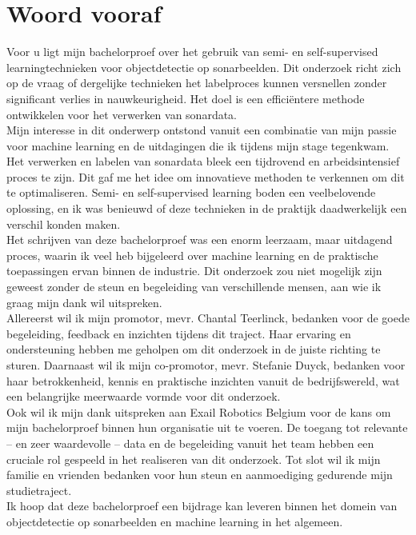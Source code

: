 
\chapter*{Woord vooraf}%
\label{ch:voorwoord}

Voor u ligt mijn bachelorproef over het gebruik van semi- en self-supervised learningtechnieken voor objectdetectie op sonarbeelden. Dit onderzoek richt zich op de vraag of dergelijke technieken het labelproces kunnen versnellen zonder significant verlies in nauwkeurigheid. Het doel is een efficiëntere methode ontwikkelen voor het verwerken van sonardata. \\

Mijn interesse in dit onderwerp ontstond vanuit een combinatie van mijn passie voor machine learning en de uitdagingen die ik tijdens mijn stage tegenkwam. Het verwerken en labelen van sonardata bleek een tijdrovend en arbeidsintensief proces te zijn. Dit gaf me het idee om innovatieve methoden te verkennen om dit te optimaliseren. Semi- en self-supervised learning boden een veelbelovende oplossing, en ik was benieuwd of deze technieken in de praktijk daadwerkelijk een verschil konden maken. \\

Het schrijven van deze bachelorproef was een enorm leerzaam, maar uitdagend proces, waarin ik veel heb bijgeleerd over machine learning en de praktische toepassingen ervan binnen de industrie. Dit onderzoek zou niet mogelijk zijn geweest zonder de steun en begeleiding van verschillende mensen, aan wie ik graag mijn dank wil uitspreken. \\

Allereerst wil ik mijn promotor, mevr. Chantal Teerlinck, bedanken voor de goede begeleiding, feedback en inzichten tijdens dit traject. Haar ervaring en ondersteuning hebben me geholpen om dit onderzoek in de juiste richting te sturen. Daarnaast wil ik mijn co-promotor, mevr. Stefanie Duyck, bedanken voor haar betrokkenheid, kennis en praktische inzichten vanuit de bedrijfswereld, wat een belangrijke meerwaarde vormde voor dit onderzoek. \\

Ook wil ik mijn dank uitspreken aan Exail Robotics Belgium voor de kans om mijn bachelorproef binnen hun organisatie uit te voeren. De toegang tot relevante -- en zeer waardevolle -- data en de begeleiding vanuit het team hebben een cruciale rol gespeeld in het realiseren van dit onderzoek. Tot slot wil ik mijn familie en vrienden bedanken voor hun steun en aanmoediging gedurende mijn studietraject. \\

Ik hoop dat deze bachelorproef een bijdrage kan leveren binnen het domein van objectdetectie op sonarbeelden en machine learning in het algemeen.